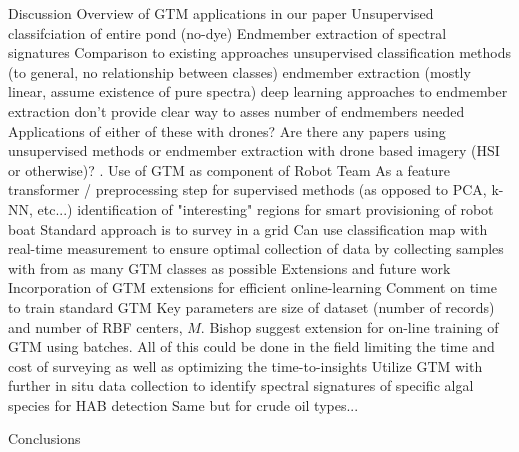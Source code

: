 \documentclass{article}
\begin{document}
\begin{outline}[enumerate]
\1 Discussion
    \2 Overview of GTM applications in our paper
        \3 Unsupervised classifciation of entire pond (no-dye)
        \3 Endmember extraction of spectral signatures
    \2 Comparison to existing approaches
        \3 unsupervised classification methods (to general, no relationship between classes) 
        \3 endmember extraction (mostly linear, assume existence of pure spectra)
        \3 deep learning approaches to endmember extraction don't provide clear way to asses number of endmembers needed
    \2 Applications of either of these with drones?
        \3 Are there any papers using unsupervised methods or endmember extraction with drone based imagery (HSI or otherwise)?
    \2. Use of GTM as component of Robot Team
        \3 As a feature transformer / preprocessing step for supervised methods (as opposed to PCA, k-NN, etc...)
        \3 identification of "interesting" regions for smart provisioning of robot boat
            \4 Standard approach is to survey in a grid
            \4 Can use classification map with real-time measurement to ensure optimal collection of data by collecting samples with from as many GTM classes as possible
    \2 Extensions and future work
        \3 Incorporation of GTM extensions for efficient online-learning
            \4 Comment on time to train standard GTM
                \5 Key parameters are size of dataset (number of records) and number of RBF centers, $M$.
            \4 Bishop suggest extension for on-line training of GTM using batches.
            \4 All of this could be done in the field limiting the time and cost of surveying as well as optimizing the time-to-insights
        \3 Utilize GTM with further in situ data collection to identify spectral signatures of specific algal species for HAB detection
        \3 Same but for crude oil types...

\1 Conclusions




\end{outline}



\end{document}
